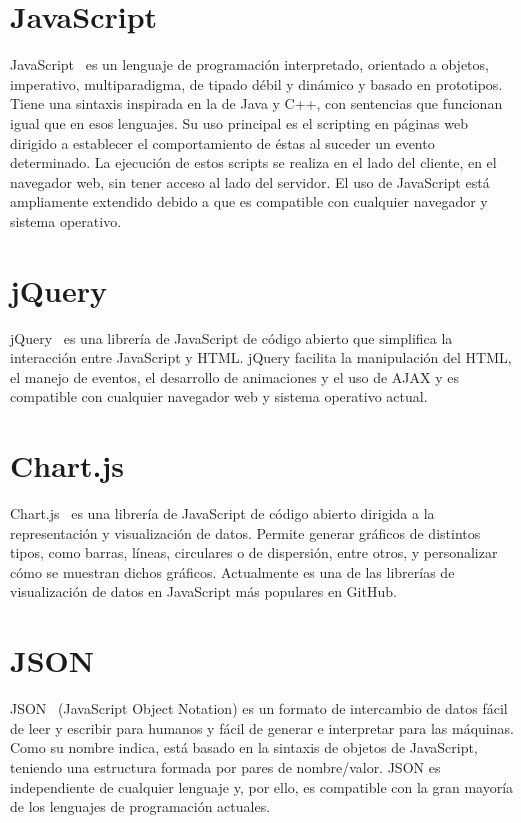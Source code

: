 \documentclass[a4paper, 12pt]{book}
\begin{document}
\section{JavaScript} 
\label{sec:javascript}

JavaScript~\cite{javascript} es un lenguaje de programación interpretado, orientado a objetos, imperativo, multiparadigma, de tipado débil y dinámico y basado en prototipos. Tiene una sintaxis inspirada en la de Java y C++, con sentencias que funcionan igual que en esos lenguajes.
Su uso principal es el scripting en páginas web dirigido a establecer el comportamiento de éstas al suceder un evento determinado. La ejecución de estos scripts se realiza en el lado del cliente, en el navegador web, sin tener acceso al lado del servidor.
El uso de JavaScript está ampliamente extendido debido a que es compatible con cualquier navegador y sistema operativo.

\section{jQuery} 
\label{sec:jquery}

jQuery~\cite{jquery} es una librería de JavaScript de código abierto que simplifica la interacción entre JavaScript y HTML. jQuery facilita la manipulación del HTML, el manejo de eventos, el desarrollo de animaciones y el uso de AJAX y es compatible con cualquier navegador web y sistema operativo actual.

\section{Chart.js} 
\label{sec:chartjs}

Chart.js~\cite{chartjs} es una librería de JavaScript de código abierto dirigida a la representación y visualización de datos. Permite generar gráficos de distintos tipos, como barras, líneas, circulares o de dispersión, entre otros, y personalizar cómo se muestran dichos gráficos.
Actualmente es una de las librerías de visualización de datos en JavaScript más populares en GitHub.

\section{JSON} 
\label{sec:json}

JSON~\cite{json} (JavaScript Object Notation) es un formato de intercambio de datos fácil de leer y escribir para humanos y fácil de generar e interpretar para las máquinas. Como su nombre indica, está basado en la sintaxis de objetos de JavaScript, teniendo una estructura formada por pares de nombre/valor.
JSON es independiente de cualquier lenguaje y, por ello, es compatible con la gran mayoría de los lenguajes de programación actuales.
\end{document}
